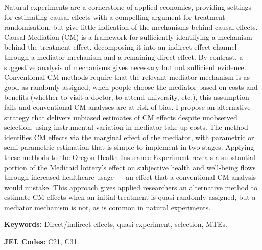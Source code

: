\noindent
Natural experiments are a cornerstone of applied economics, providing settings for estimating causal effects with a compelling argument for treatment randomisation, but give little indication of the mechanisms behind causal effects.
Causal Mediation (CM) is a framework for sufficiently identifying a mechanism behind the treatment effect, decomposing it into an indirect effect channel through a mediator mechanism and a remaining direct effect.
By contrast, a suggestive analysis of mechanisms gives necessary but not sufficient evidence.
Conventional CM methods require that the relevant mediator mechanism is as-good-as-randomly assigned; when people choose the mediator based on costs and benefits (whether to visit a doctor, to attend university, etc.), this assumption fails and conventional CM analyses are at risk of bias.
I propose an alternative strategy that delivers unbiased estimates of CM effects despite unobserved selection, using instrumental variation in mediator take-up costs.
The method identifies CM effects via the marginal effect of the mediator, with parametric or semi-parametric estimation that is simple to implement in two stages.
Applying these methods to the Oregon Health Insurance Experiment reveals a substantial portion of the Medicaid lottery's effect on subjective health and well-being flows through increased healthcare usage --- an effect that a conventional CM analysis would mistake.
This approach gives applied researchers an alternative method to estimate CM effects when an initial treatment is quasi-randomly assigned, but a mediator mechanism is not, as is common in natural experiments.

\vspace{0.5cm}
\noindent
\textbf{Keywords:}
Direct/indirect effects, quasi-experiment, selection, MTEs.

\vspace{0.1cm}
\noindent
\textbf{JEL Codes:}
C21, C31.
